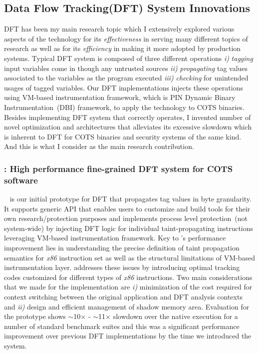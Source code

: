 \documentclass[letterpaper, 10pt]{article}
\begin{document}
\begin{small}
\subsection*{Data Flow Tracking(DFT) System Innovations}
%
DFT has been my main research topic which I extensively explored various
aspects of the technology for its {\it effectiveness} in serving many different
topics of research as well as for its {\it efficiency} in making it more
adopted by production systems.
%
Typical DFT system is composed of three different operations {\it i)} {\it
tagging} input variables come in though any untrusted sources {\it ii)} {\it
propagating} tag values associated to the variables as the program executed
{\it iii)} {\it checking} for unintended usages of tagged variables. Our DFT
implementations injects these operations using VM-based instrumentation
framework, which is PIN Dynamic Binary Instrumentation~(DBI) framework, to
apply the technology to COTS binaries.
%
Besides implementing DFT system that correctly operates, I invented number of
novel optimization and architectures that alleviates its excessive slowdown
which is inherent to DFT for COTS binaries and security systems of the same
kind. And this is what I consider as the main research contribution.

\subsubsection*{\libdft: High performance fine-grained DFT system for COTS
software}

\libdft~\cite{libdft:2012vee} is our initial prototype for DFT that propagates
tag values in byte granularity.
%
It supports generic API that enables users to customize and build tools for
their own research/protection purposes and implements process level
protection~(not system-wide) by injecting DFT logic for individual
taint-propagating instructions leveraging VM-based instrumentation framework.
%
Key to \libdft's performance improvement lies in understanding the precise
definition of taint propagation semantics for {\it x86} instruction set as well
as the structural limitations of VM-based instrumentation layer. \libdft
addresses these issues by introducing optimal tracking codes customized for
different types of {\it x86} instructions. Two main considerations that we made
for the implementation are {\it i)} minimization of the cost required for
context switching between the original application and DFT analysis contexts
and {\it ii)} design and efficient management of shadow memory area.
%
Evaluation for the prototype shows $\sim$10$\times$ - $\sim$11$\times$ slowdown
over the native execution for a number of standard benchmark suites and this
was a significant performance improvement over previous DFT implementations by
the time we introduced the system.


\end{small}
\end{document}
